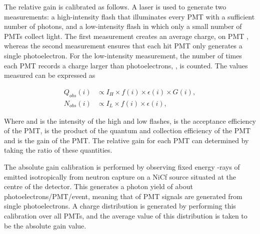 The relative gain is calibrated as follows. A laser is used to generate two measurements: a high-intensity flash that illuminates every PMT with a sufficient number of photons, and a low-intensity flash in which only a small number of PMTs collect light. The first measurement creates an average charge,  on PMT , whereas the second measurement ensures that each hit PMT only generates a single photoelectron. For the low-intensity measurement, the number of times each PMT records a charge larger than  photoelectrons, , is counted. The values measured can be expressed as

\begin{equation}
  \label{eq:T2KSKExp_RelativeGainCalib}
  \begin{split}
    Q_{obs}(i) &\propto I_{H} \times f(i) \times \epsilon(i) \times G(i), \\
    N_{obs}(i) &\propto I_{L} \times f(i) \times \epsilon(i),
  \end{split}
\end{equation}

Where  and  is the intensity of the high and low flashes,  is the acceptance efficiency of the  PMT,  is the product of the quantum and collection efficiency of the  PMT and  is the gain of the 	PMT. The relative gain for each PMT can determined by taking the ratio of these quantities.

The absolute gain calibration is performed by observing fixed energy \quickmath{\gamma}-rays of  emitted isotropically from neutron capture on a NiCf source situated at the centre of the detector. This generates a photon yield of about  photoelectrons/PMT/event, meaning that  of PMT signals are generated from single photoelectrons. A charge distribution is generated by performing this calibration over all PMTs, and the average value of this distribution is taken to be the absolute gain value.

